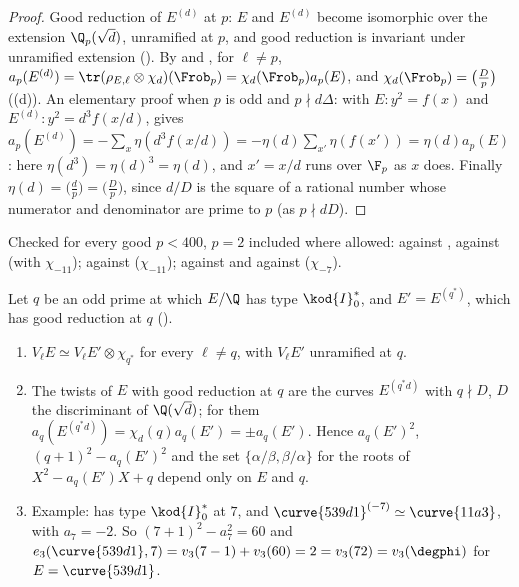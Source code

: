 \begin{proof}
Good reduction of $E^{(d)}$ at $p$: $E$ and $E^{(d)}$ become isomorphic over the extension $\Q_p(\sqrt d)$, unramified at $p$, and good reduction is invariant under unramified extension
(). By  and , for $\ell\ne p$, $a_p(E^{(d)})=\tr(\rho_{E,\ell}\otimes\chi_d)(\Frob_p)=\chi_d(\Frob_p)a_p(E)$, and $\chi_d(\Frob_p)=\bigl(\frac Dp\bigr)$
((d)). An elementary proof when $p$ is odd and $p\nmid d\Delta$: with $E\colon y^2=f(x)$ and $E^{(d)}\colon y^2=d^3f(x/d)$,  gives
$a_p(E^{(d)})=-\sum_x\eta(d^3f(x/d))=-\eta(d)\sum_{x'}\eta(f(x'))=\eta(d)a_p(E)$: here $\eta(d^3)=\eta(d)^3=\eta(d)$, and $x'=x/d$ runs over $\F_p$ as $x$ does. Finally
$\eta(d)=\bigl(\frac dp\bigr)=\bigl(\frac Dp\bigr)$, since $d/D$ is the square of a rational number whose numerator and denominator are prime to $p$ (as $p\nmid dD$).
\end{proof}

\noindent Checked for every good $p<400$, $p=2$ included where allowed:  against ,  against  (with $\chi_{-11}$);  against 
($\chi_{-11}$);  against  and  against  ($\chi_{-7}$).

\begin{proposition}\label{prop:ellcurves:twistgood}
Let $q$ be an odd prime at which $E/\Q$ has type $\kod{I}_0^*$, and $E'=E^{(q^*)}$, which has good reduction at $q$ ().
\begin{enumerate}[label=(\roman*)]
\item $V_\ell E\simeq V_\ell E'\otimes\chi_{q^*}$ for every $\ell\ne q$, with $V_\ell E'$ unramified at $q$.
\item The twists of $E$ with good reduction at $q$ are the curves $E^{(q^*d)}$ with $q\nmid D$, $D$ the discriminant of $\Q(\sqrt d)$; for them $a_q(E^{(q^*d)})=\chi_d(q)a_q(E')=\pm a_q(E')$. Hence
$a_q(E')^2$, $(q+1)^2-a_q(E')^2$ and the set $\{\alpha/\beta,\beta/\alpha\}$ for the roots of $X^2-a_q(E')X+q$ depend only on $E$ and $q$.
\item Example:  has type $\kod{I}_0^*$ at $7$, and $\curve{539d1}^{(-7)}\simeq\curve{11a3}$, with $a_7=-2$. So $(7+1)^2-a_7^2=60$ and
$e_3(\curve{539d1},7)=v_3(7-1)+v_3(60)=2=v_3(72)=v_3(\degphi)$ for $E=\curve{539d1}$.
\end{enumerate}
\end{proposition}

